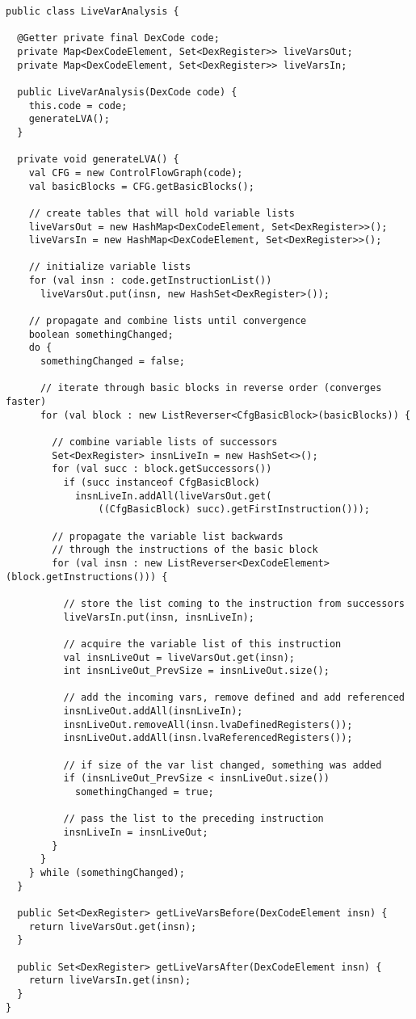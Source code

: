 \begin{lstlisting}
public class LiveVarAnalysis {

  @Getter private final DexCode code;
  private Map<DexCodeElement, Set<DexRegister>> liveVarsOut;
  private Map<DexCodeElement, Set<DexRegister>> liveVarsIn;

  public LiveVarAnalysis(DexCode code) {
    this.code = code;
    generateLVA();
  }

  private void generateLVA() {
    val CFG = new ControlFlowGraph(code);
    val basicBlocks = CFG.getBasicBlocks();

    // create tables that will hold variable lists
    liveVarsOut = new HashMap<DexCodeElement, Set<DexRegister>>();
    liveVarsIn = new HashMap<DexCodeElement, Set<DexRegister>>();
    
    // initialize variable lists
    for (val insn : code.getInstructionList())
      liveVarsOut.put(insn, new HashSet<DexRegister>());

    // propagate and combine lists until convergence
    boolean somethingChanged;
    do {
      somethingChanged = false;

      // iterate through basic blocks in reverse order (converges faster)
      for (val block : new ListReverser<CfgBasicBlock>(basicBlocks)) {

    	// combine variable lists of successors   
        Set<DexRegister> insnLiveIn = new HashSet<>();
        for (val succ : block.getSuccessors())
          if (succ instanceof CfgBasicBlock)
            insnLiveIn.addAll(liveVarsOut.get(
            	((CfgBasicBlock) succ).getFirstInstruction()));

        // propagate the variable list backwards 
        // through the instructions of the basic block 
        for (val insn : new ListReverser<DexCodeElement>(block.getInstructions())) {
        	
          // store the list coming to the instruction from successors
          liveVarsIn.put(insn, insnLiveIn);

          // acquire the variable list of this instruction  
          val insnLiveOut = liveVarsOut.get(insn);
          int insnLiveOut_PrevSize = insnLiveOut.size();

          // add the incoming vars, remove defined and add referenced
          insnLiveOut.addAll(insnLiveIn);
          insnLiveOut.removeAll(insn.lvaDefinedRegisters());
          insnLiveOut.addAll(insn.lvaReferencedRegisters());

          // if size of the var list changed, something was added
          if (insnLiveOut_PrevSize < insnLiveOut.size())
            somethingChanged = true;

          // pass the list to the preceding instruction
          insnLiveIn = insnLiveOut;
        }
      }
    } while (somethingChanged);
  }

  public Set<DexRegister> getLiveVarsBefore(DexCodeElement insn) {
    return liveVarsOut.get(insn);
  }

  public Set<DexRegister> getLiveVarsAfter(DexCodeElement insn) {
    return liveVarsIn.get(insn);
  }
}
\end{lstlisting}
